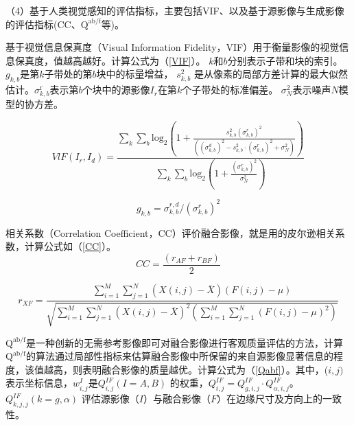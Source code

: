（4）基于人类视觉感知的评估指标，主要包括VIF\cite{han2013new}、以及基于源影像与生成影像的评估指标(CC\cite{han2008study}、$\mathrm{Q^{ab/f}}$\cite{piella2003new}等)。

基于视觉信息保真度（Visual Information Fidelity，VIF）用于衡量影像的视觉信息保真度，值越高越好\cite{han2013new}。计算公式为（\ref{VIF}）。
$k$和$b$分别表示子带和块的索引。$g_{k,b}$是第$k$子带处的第$b$块中的标量增益， $s_{k,b}^2$ 是从像素的局部方差计算的最大似然估计。$\sigma_{k,b}^\mathrm{r}$表示第$b$个块中的源影像$I_r$在第$k$个子带处的标准偏差。%
$\sigma_{N}^{2}$表示噪声$N$模型的协方差。
 
\begin{equation}\label{VIF}
VlF(I_r,I_d)=\frac{\sum_k\sum_b\mathrm{log}_2\left(1+\frac{s_{k,b}^{2\cdot}\left(\sigma_{k,b}^{r}\right)^2}{\left(\left(\sigma_{k,b}^{d}\right)^2-s_{k,b}^2\cdot\left(\sigma_{k,b}^{r}\right)^2+\sigma_{N}^2\right)}\right)}{\sum_k\sum_b\mathrm{log}_2\left(1+\frac{\left(\sigma_{k,b}^{r}\right)^2}{\sigma_N^2}\right)}
\end{equation}

\begin{equation}
g_{k,b}=\sigma_{k,b}^{r,d}/\left(\sigma_{k,b}^{r}\right)^{2}
\end{equation}



相关系数（Correlation Coefficient，CC）评价融合影像，就是用的皮尔逊相关系数\cite{han2008study}，计算公式如（\ref{CC}）。
\begin{equation}\label{CC}
CC=\frac{(r_{AF}+r_{BF})}{2}
\end{equation}

\begin{equation}
r_{XF}=\frac{\sum_{i=1}^{M}\sum_{j=1}^{N}(X(i,j)-\overline{X})(F(i,j)-\mu)}{\sqrt{\sum_{i=1}^{M}\sum_{j=1}^{N}(X(i,j)-\overline{X})^{2}\left(\sum_{i=1}^{M}\sum_{j=1}^{N}(F(i,j)-\mu)^{2}\right)}}
\end{equation}

$\mathrm{Q^{ab/f}}$是一种创新的无需参考影像即可对融合影像进行客观质量评估的方法\cite{piella2003new}，计算$\mathrm{Q^{ab/f}}$的算法通过局部性指标来估算融合影像中所保留的来自源影像显著信息的程度，该值越高，则表明融合影像的质量越优。计算公式为（\ref{Qabf}）。其中，($i,j)$表示坐标信息，$w_{i,j}^{I}$是$Q_{i,j}^{IF}(I=A,B)$ 的权重，$Q_{i,j}^{IF}=Q_{g,i,j}^{IF}\cdot Q_{\alpha,i,j}^{IF}$。$Q_{k,j,j}^{IF}(k=g,\alpha)$ 评估源影像（$I$）与融合影像（$F$）在边缘尺寸及方向上的一致性。


